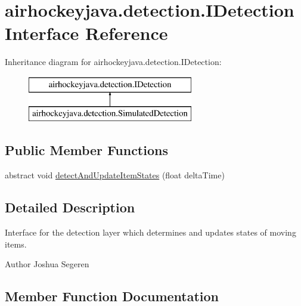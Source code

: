 \hypertarget{interfaceairhockeyjava_1_1detection_1_1_i_detection}{}\section{airhockeyjava.\+detection.\+I\+Detection Interface Reference}
\label{interfaceairhockeyjava_1_1detection_1_1_i_detection}
Inheritance diagram for airhockeyjava.\+detection.\+I\+Detection\+:\begin{figure}[H]
\begin{center}
\leavevmode
\includegraphics[height=2.000000cm]{interfaceairhockeyjava_1_1detection_1_1_i_detection}
\end{center}
\end{figure}
\subsection*{Public Member Functions}
\begin{DoxyCompactItemize}
\item 
abstract void \hyperlink{interfaceairhockeyjava_1_1detection_1_1_i_detection_a33002ee7b6eda99e49aec27d32dfc198}{detect\+And\+Update\+Item\+States} (float delta\+Time)
\end{DoxyCompactItemize}


\subsection{Detailed Description}
Interface for the detection layer which determines and updates states of moving items.

\begin{DoxyAuthor}{Author}
Joshua Segeren 
\end{DoxyAuthor}


\subsection{Member Function Documentation}
\hypertarget{interfaceairhockeyjava_1_1detection_1_1_i_detection_a33002ee7b6eda99e49aec27d32dfc198}{}

